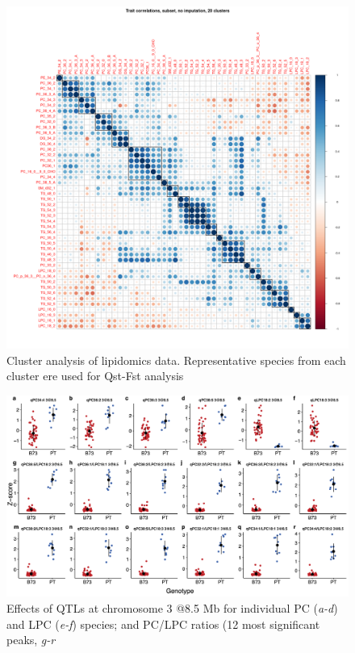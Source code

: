 \documentclass[9pt,twocolumn,twoside,lineno]{biorxiv}
\begin{document}
\clearpage

\begin{figure}[t]
\begin{center}
\includegraphics[width=0.8\paperwidth]{Sup_Figures/Sup_Fig_1.png}
\caption{Cluster analysis of lipidomics data. Representative species from each cluster ere used for Qst-Fst analysis}
\label{figure:Sup:lipid_clusters}
\end{center}
\end{figure}  

\clearpage

\begin{figure}[t]
\begin{center}
\includegraphics[width=0.8\paperwidth]{Sup_Figures/Sup_Fig_2.png}
\caption{Effects of QTLs at chromosome 3 @8.5 Mb for individual PC (\textit{a-d}) and LPC (\textit{e-f}) species; and PC/LPC ratios (12 most significant peaks, \textit{g-r}
} 
\label{figure:Sup:QTL_effect_sp}
\end{center}
\end{figure}  
\end{document}
